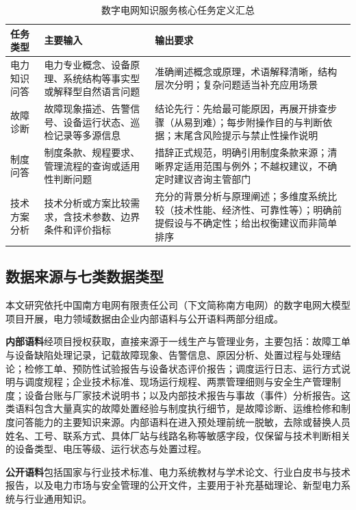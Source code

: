 \documentclass[fontset=fandol,type=master,campus=shenzhen,etitleauto=true]{hithesisbook}
\begin{document}
\begin{table}[htbp]
\centering
\caption{数字电网知识服务核心任务定义汇总}
\label{tab:task-def}
\small
\begin{tabular}{p{2.5cm}p{4.5cm}p{6.0cm}}
\toprule
\textbf{任务类型} & \textbf{主要输入} & \textbf{输出要求} \\
\midrule
电力知识问答 & 电力专业概念、设备原理、系统结构等事实型或解释型自然语言问题 & 准确阐述概念或原理，术语解释清晰，结构层次分明；复杂问题适当补充应用场景 \\
\addlinespace
故障诊断 & 故障现象描述、告警信号、设备运行状态、巡检记录等多源信息 & 结论先行：先给最可能原因，再展开排查步骤（从易到难）；每步附操作目的与判断依据；末尾含风险提示与禁止性操作说明 \\
\addlinespace
制度问答 & 制度条款、规程要求、管理流程的查询或适用性判断问题 & 措辞正式规范，明确引用制度条款来源；清晰界定适用范围与例外；不越权建议，不确定时建议咨询主管部门 \\
\addlinespace
技术方案分析 & 技术分析或方案比较需求，含技术参数、边界条件和评价指标 & 充分的背景分析与原理阐述；多维度系统比较（技术性能、经济性、可靠性等）；明确前提假设与不确定性；给出权衡建议而非简单排序 \\
\bottomrule
\end{tabular}
\end{table}

\subsection{数据来源与七类数据类型}\label{ux6570ux636eux6765ux6e90ux4e0eux4e03ux7c7bux6570ux636eux7c7bux578b}

本文研究依托中国南方电网有限责任公司（下文简称南方电网）的数字电网大模型项目开展，电力领域数据由企业内部语料与公开语料两部分组成。

\textbf{内部语料}经项目授权获取，直接来源于一线生产与管理业务，主要包括：故障工单与设备缺陷处理记录，记载故障现象、告警信息、原因分析、处置过程与处理结论；检修工单、预防性试验报告与设备状态评价报告；调度运行日志、运行方式说明与调度规程；企业技术标准、现场运行规程、两票管理细则与安全生产管理制度；设备台账与厂家技术说明书；以及内部技术报告与事故（事件）分析报告。这类语料包含大量真实的故障处置经验与制度执行细节，是故障诊断、运维检修和制度问答能力的主要知识来源。内部语料在进入预处理前统一脱敏，去除或替换人员姓名、工号、联系方式、具体厂站与线路名称等敏感字段，仅保留与技术判断相关的设备类型、电压等级、运行状态与处置过程。

\textbf{公开语料}包括国家与行业技术标准、电力系统教材与学术论文、行业白皮书与技术报告，以及电力市场与安全管理的公开文件，主要用于补充基础理论、新型电力系统与行业通用知识。
\end{document}
